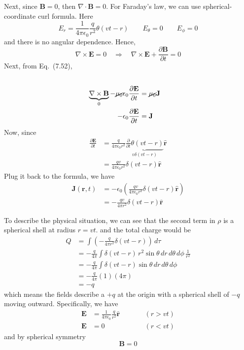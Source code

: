 \documentclass[12pt]{article}
\begin{document}
\begin{enumerate}
Next, since $\mathbf B=0$, then $\nabla\cdot \mathbf B=0$. For Faraday's law, we can use spherical-coordinate curl formula. Here
$$
E_r=\frac{1}{4\pi\epsilon_0}\frac{q}{r^2}\theta(vt-r)
\qquad
E_\theta=0
\qquad
E_\phi=0
$$
and there is no angular dependence. Hence, 
$$
\nabla\times \mathbf E=0 \quad \Longrightarrow \quad \nabla\times \mathbf E+\frac{\partial \mathbf B}{\partial t}=0
$$
Next, from Eq.~(7.52),
$$
\begin{align} \\
\underbrace{ \nabla\times \mathbf B }_{0}-\cancel{ \mu_0 }\epsilon_0\frac{\partial \mathbf E}{\partial t} & =\cancel{ \mu_0}\mathbf J\\
-\epsilon_0\frac{\partial \mathbf E}{\partial t}  & = \mathbf J  \\
\end{align}
$$
Now, since
$$
\begin{aligned}
\frac{\partial \mathbf E}{\partial t}
&=
\frac{q}{4\pi\epsilon_0 r^2}
\underbrace{ \frac{\partial}{\partial t}\theta(vt-r) }_{ v\delta(vt-r) }\hat{\mathbf r} \\
&=
\frac{qv}{4\pi\epsilon_0 r^2}\delta(vt-r)\hat{\mathbf r}
\end{aligned}
$$
Plug it back to the formula, we have
$$
\begin{aligned}
\mathbf J(\mathbf r,t)
 & = -\epsilon_{0}\left( \frac{qv}{4\pi\epsilon_{0}r^{2}} \delta(vt-r)\mathbf{\hat{r}}\right)  \\
 & =-\frac{qv}{4\pi r^2}\delta(vt-r)\hat{\mathbf r}
\end{aligned}
$$

To describe the physical situation, we can see that the second term in $\rho$ is a spherical shell at radius $r=vt$. and the total charge would be
$$
\begin{aligned}
Q
&=
\int
\left(
-\frac{q}{4\pi r^2}\delta(vt-r)
\right)
\,d\tau \\
&=
-\frac{q}{4\pi}
\int \delta(vt-r)\,r^2\sin\theta\,dr\,d\theta\,d\phi \,\frac{1}{r^2} \\
&=
-\frac{q}{4\pi}
\int \delta(vt-r)\sin\theta\,dr\,d\theta\,d\phi \\
&=
-\frac{q}{4\pi}(1)(4\pi) \\
&=
-q
\end{aligned}
$$
which means the fields describe a $+q$ at the origin with a spherical shell of $-q$ moving outward. Specifically, we have
$$
\begin{aligned}
\mathbf E & =\frac{1}{4\pi\epsilon_0}\frac{q}{r^2}\hat{\mathbf r}
\qquad &  & (r>vt)\\
\mathbf E & =0
\qquad &  & (r<vt)
\end{aligned}
$$
and by spherical symmetry
$$
\mathbf B=0
$$
\end{enumerate}
\end{document}
